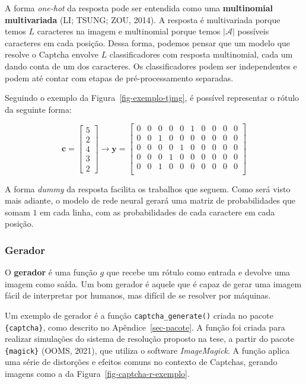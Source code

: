 \documentclass[12pt,twoside,brazilian]{book}
\begin{document}
A forma \emph{one-hot} da resposta pode ser entendida como uma
\textbf{multinomial} \textbf{multivariada} (LI; TSUNG; ZOU, 2014). A
resposta é multivariada porque temos \(L\) caracteres na imagem e
multinomial porque temos \(|\mathcal A|\) possíveis caracteres em cada
posição. Dessa forma, podemos pensar que um modelo que resolve o Captcha
envolve \(L\) classificadores com resposta multinomial, cada um dando
conta de um dos caracteres. Os classificadores podem ser independentes e
podem até contar com etapas de pré-processamento separadas.

Seguindo o exemplo da Figura~\ref{fig-exemplo-tjmg}, é possível
representar o rótulo da seguinte forma:

\[
\mathbf c = \left[\begin{array}{c}
     5  \\
     2 \\
     4 \\
     3 \\
     2
\end{array}\right] \rightarrow \mathbf{y} = \left[\begin{array}{cccccccccc}
    0 & 0 & 0 & 0 & 0 & 1 & 0 & 0 & 0 & 0 \\
    0 & 0 & 1 & 0 & 0 & 0 & 0 & 0 & 0 & 0 \\
    0 & 0 & 0 & 0 & 1 & 0 & 0 & 0 & 0 & 0 \\
    0 & 0 & 0 & 1 & 0 & 0 & 0 & 0 & 0 & 0 \\
    0 & 0 & 1 & 0 & 0 & 0 & 0 & 0 & 0 & 0 \\
\end{array}\right]
\]

A forma \emph{dummy} da resposta facilita os trabalhos que seguem. Como
será visto mais adiante, o modelo de rede neural gerará uma matriz de
probabilidades que somam \(1\) em cada linha, com as probabilidades de
cada caractere em cada posição.

\hypertarget{gerador}{%
\subsubsection{Gerador}\label{gerador}}

O \textbf{gerador} é uma função \(g\) que recebe um rótulo como entrada
e devolve uma imagem como saída. Um bom gerador é aquele que é capaz de
gerar uma imagem fácil de interpretar por humanos, mas difícil de se
resolver por máquinas.

Um exemplo de gerador é a função \texttt{captcha\_generate()} criada no
pacote \texttt{\{captcha\}}, como descrito no Apêndice~\ref{sec-pacote}.
A função foi criada para realizar simulações do sistema de resolução
proposto na tese, a partir do pacote \texttt{\{magick\}} (OOMS, 2021),
que utiliza o software \emph{ImageMagick}. A função aplica uma série de
distorções e efeitos comuns no contexto de Captchas, gerando imagens
como a da Figura~\ref{fig-captcha-r-exemplo}.
\end{document}
